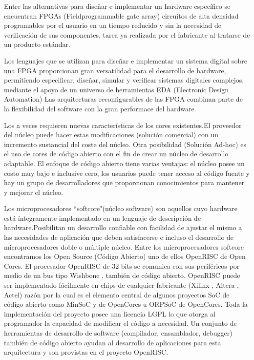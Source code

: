 Entre las alternativas para diseñar e implementar un hardware específico se encuentran FPGAs (Fieldprogrammable gate array) circuitos de alta densidad programables por el usuario en un tiempo reducido y sin la necesidad de verificación de sus componentes, tarea ya realizada por el fabricante al tratarse de un producto estándar.

Los lenguajes que se utilizan para diseñar e implementar un sistema digital sobre una FPGA proporcionan gran versatilidad para el desarrollo de hardware, permitiendo especificar, diseñar, simular y verificar sistemas digitales complejos, mediante el apoyo de un universo de herramientas EDA (Electronic Design Automation)
Las arquitecturas reconfigurables de las FPGA combinan parte de la flexibilidad del software con la gran performace del hardware.

Los  a veces requieren nuevas características de los cores existentes.El proveedor del núcleo puede hacer estas modificaciones (solución comercial) con un incremento sustancial del coste del núcleo. Otra posibilidad (Solución Ad-hoc) es el uso de cores de código abierto con el fin de crear un núcleo de desarrollo adaptable. El enfoque de código abierto tiene varias ventajas: el núcleo posee un costo muy bajo e inclusive cero, los usuarios puede tener acceso al código fuente y hay un grupo de desarrolladores que proporcionan conocimientos para mantener y mejorar el núcleo.

Los microprocesadores “softcore"(núcleo software) son aquellos cuyo hardware está íntegramente implementado en un lenguaje de descripción de hardware.Posibilitan un desarrollo confiable con facilidad de ajustar el mismo a las necesidades de aplicación que deben satisfacerse e incluso el desarrollo de microprocesadores doble o múltiple núcleo.
Entre los microprocesadores softcore encontramos los Open Source (Código Abierto) uno de ellos OpenRISC de Open Cores.
El procesador OpenRISC de 32 bits se comunica con sus periféricos por medio de un bus tipo Wishbone , también de código abierto. OpenRISC puede ser implementado
fácilmente en chips de cualquier fabricante (Xilinx , Altera , Actel) razón por la cual es el elemento central de algunos proyectos SoC de código abierto como MinSoC y 
de OpenCores u ORPSoC de OpenCores. 
Toda la implementación del proyecto posee una licencia LGPL lo que otorga al programador la capacidad de modificar el código a necesidad. Un conjunto de herramientas de desarrollo de software (compilador, ensamblador, debugger) también de código abierto ayudan al desarrollo de aplicaciones para esta arquitectura y son provistas en el proyecto OpenRISC.

